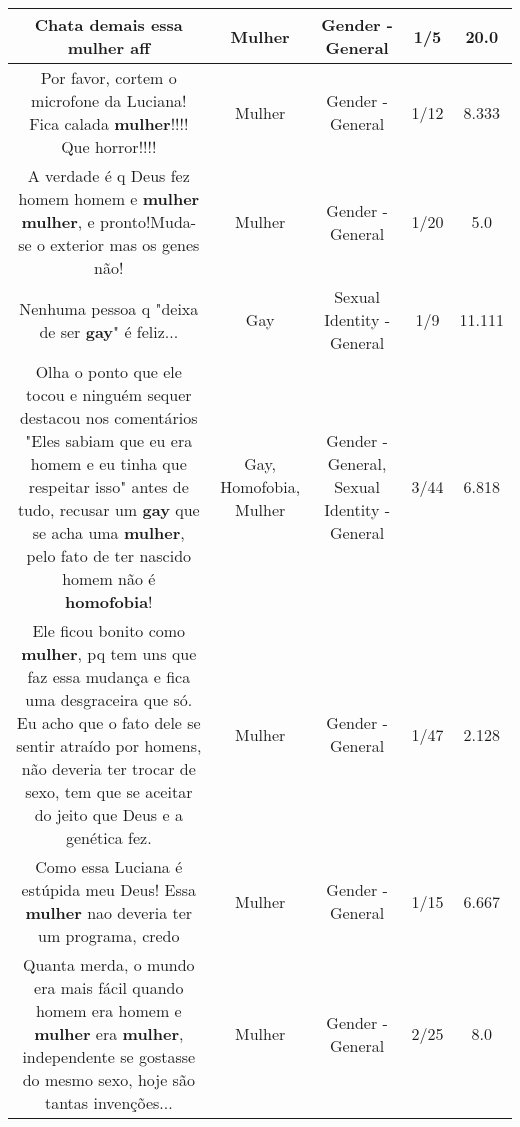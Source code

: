 \documentclass[11pt]{article}
\newlength\mylength
\begin{document}
\begin{center}
\begin{longtable}{|C{.65\mylength}|C{.30\mylength}|C{.12\mylength}|C{.12\mylength}|C{.12\mylength}|}
  \small Chata demais essa \textbf{mulher} aff\normalsize   & Mulher & Gender - General & 1/5 & 20.0 \\  \hline
  \small Por favor, cortem o microfone da Luciana! Fica calada \textbf{mulher}!!!! Que horror!!!!\normalsize   & Mulher & Gender - General & 1/12 & 8.333 \\  \hline
  \small A verdade é q Deus fez homem homem e \textbf{mulher} \textbf{mulher}, e pronto!Muda-se o exterior mas os genes não!\normalsize   & Mulher & Gender - General & 1/20 & 5.0 \\  \hline
  \small Nenhuma pessoa q "deixa de ser \textbf{gay}" é feliz...\normalsize   & Gay & Sexual Identity - General & 1/9 & 11.111 \\  \hline
  \small Olha o ponto que ele tocou e ninguém sequer destacou nos comentários "Eles sabiam que eu era homem e eu tinha que respeitar isso" antes de tudo, recusar um \textbf{gay} que se acha uma \textbf{mulher}, pelo fato de ter nascido homem não é \textbf{homofobia}!\normalsize   & Gay, Homofobia, Mulher & Gender - General, Sexual Identity - General & 3/44 & 6.818 \\  \hline
  \small Ele ficou bonito como \textbf{mulher}, pq tem uns que faz essa mudança e fica uma desgraceira que só. Eu acho que o fato dele se sentir atraído por homens, não deveria ter trocar de sexo, tem que se aceitar do jeito que Deus e a genética fez.\normalsize   & Mulher & Gender - General & 1/47 & 2.128 \\  \hline
  \small Como essa Luciana é estúpida meu Deus! Essa \textbf{mulher} nao deveria ter um programa, credo\normalsize   & Mulher & Gender - General & 1/15 & 6.667 \\  \hline
  \small Quanta merda, o mundo era mais fácil quando homem era homem e \textbf{mulher} era \textbf{mulher}, independente se gostasse do mesmo sexo, hoje são tantas invenções...\normalsize   & Mulher & Gender - General & 2/25 & 8.0 \\  \hline

\end{longtable}
\end{center}
\end{document}
